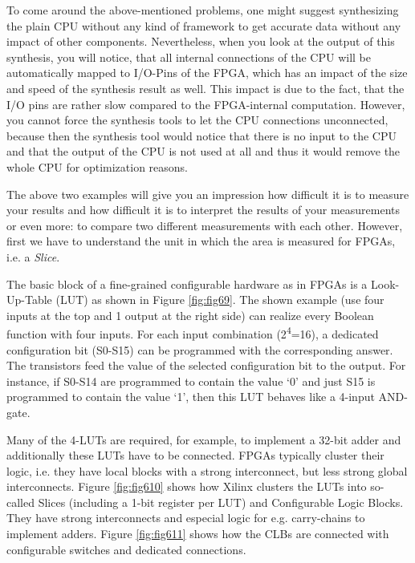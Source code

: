 To come around the above-mentioned problems, one might suggest
synthesizing the plain CPU without any kind of framework to get accurate
data without any impact of other components. Nevertheless, when you look
at the output of this synthesis, you will notice, that all internal
connections of the CPU will be automatically mapped to I/O-Pins of the
FPGA, which has an impact of the size and speed of the synthesis result
as well. This impact is due to the fact, that the I/O pins are rather
slow compared to the FPGA-internal computation. However, you cannot
force the synthesis tools to let the CPU connections unconnected,
because then the synthesis tool would notice that there is no input to
the CPU and that the output of the CPU is not used at all and thus it
would remove the whole CPU for optimization reasons.

The above two examples will give you an impression how difficult it is
to measure your results and how difficult it is to interpret the results
of your measurements or even more: to compare two different measurements
with each other. However, first we have to understand the unit in which
the area is measured for FPGAs, i.e. a \emph{Slice}.

The basic block of a fine-grained configurable hardware as in FPGAs is a
Look-Up-Table (LUT) as shown in Figure \ref{fig:fig69}.
The shown example (use four inputs at the top and 1 output at the right
side) can realize every Boolean function with four inputs. For each
input combination (2\textsuperscript{4}=16), a dedicated configuration
bit (S0-S15) can be programmed with the corresponding answer. The
transistors feed the value of the selected configuration bit to the
output. For instance, if S0-S14 are programmed to contain the value `0'
and just S15 is programmed to contain the value `1', then this LUT
behaves like a 4-input AND-gate.

Many of the 4-LUTs are required, for example, to implement a 32-bit
adder and additionally these LUTs have to be connected. FPGAs typically
cluster their logic, i.e. they have local blocks with a strong
interconnect, but less strong global interconnects.
Figure \ref{fig:fig610} shows how Xilinx clusters the
LUTs into so-called Slices (including a 1-bit register per LUT) and
Configurable Logic Blocks. They have strong interconnects and especial
logic for e.g. carry-chains to implement adders.
Figure \ref{fig:fig611} shows how the CLBs are connected
with configurable switches and dedicated connections.

